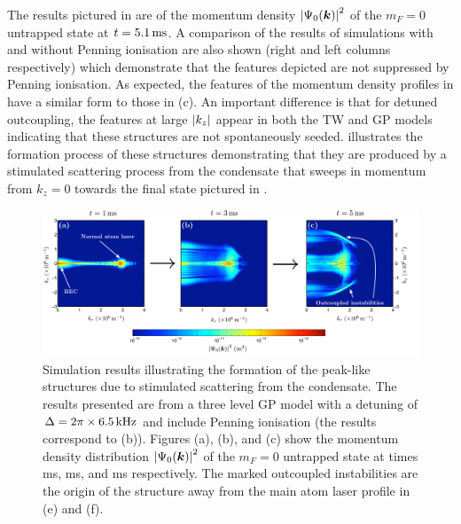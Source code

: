 The results pictured in  are of the momentum density $\left|\Psi_0(\bm{k})\right|^2$ of the $m_F=0$ untrapped state at $t=\unit[5.1]{ms}$. A comparison of the results of simulations with and without Penning ionisation are also shown (right and left columns respectively) which demonstrate that the features depicted are not suppressed by Penning ionisation. As expected, the features of the momentum density profiles in  have a similar form to those in (c). An important difference is that for detuned outcoupling, the features at large $\left|k_z\right|$ appear in both the TW and GP models indicating that these structures are not spontaneously seeded.  illustrates the formation process of these structures demonstrating that they are produced by a stimulated scattering process from the condensate that sweeps in momentum from $k_z=0$ towards the final state pictured in . 

\begin{figure}
    \centering
    \includegraphics[width=20cm]{DetunedPeaksFormationProcess}
    \caption{Simulation results illustrating the formation of the peak-like structures due to stimulated scattering from the condensate. The results presented are from a three level GP model with a detuning of $\Delta = 2\pi \times \unit[6.5]{kHz}$ and include Penning ionisation (the results correspond to (b)). Figures (a), (b), and (c) show the momentum density distribution $\left|\Psi_0(\bm{k})\right|^2$ of the $m_F=0$ untrapped state at times \unit[1]{ms}, \unit[3]{ms}, and \unit[5]{ms} respectively. The marked outcoupled instabilities are the origin of the structure away from the main atom laser profile in (e) and (f).
    \label{Peaks:DetunedPeaksFormationProcess}}
\end{figure}

